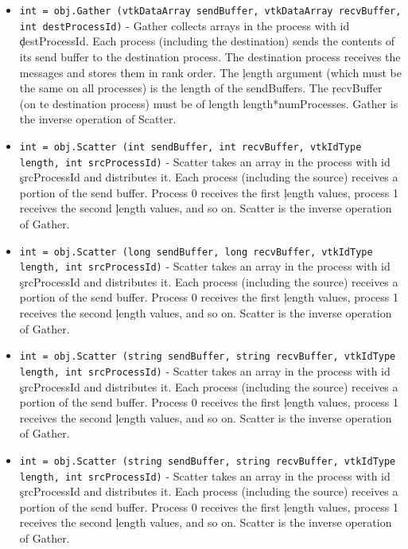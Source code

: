 \begin{itemize}
\item  \verb|int = obj.Gather (vtkDataArray sendBuffer, vtkDataArray recvBuffer, int destProcessId)| -  Gather collects arrays in the process with id \c destProcessId.  Each
 process (including the destination) sends the contents of its send buffer
 to the destination process.  The destination process receives the
 messages and stores them in rank order.  The \c length argument
 (which must be the same on all processes) is the length of the
 sendBuffers.  The \c recvBuffer (on te destination process) must be of
 length length*numProcesses.  Gather is the inverse operation of Scatter.

\item  \verb|int = obj.Scatter (int sendBuffer, int recvBuffer, vtkIdType length, int srcProcessId)| -  Scatter takes an array in the process with id \c srcProcessId and
 distributes it.  Each process (including the source) receives a portion of
 the send buffer.  Process 0 receives the first \c length values, process 1
 receives the second \c length values, and so on.  Scatter is the inverse
 operation of Gather.

\item  \verb|int = obj.Scatter (long sendBuffer, long recvBuffer, vtkIdType length, int srcProcessId)| -  Scatter takes an array in the process with id \c srcProcessId and
 distributes it.  Each process (including the source) receives a portion of
 the send buffer.  Process 0 receives the first \c length values, process 1
 receives the second \c length values, and so on.  Scatter is the inverse
 operation of Gather.

\item  \verb|int = obj.Scatter (string sendBuffer, string recvBuffer, vtkIdType length, int srcProcessId)| -  Scatter takes an array in the process with id \c srcProcessId and
 distributes it.  Each process (including the source) receives a portion of
 the send buffer.  Process 0 receives the first \c length values, process 1
 receives the second \c length values, and so on.  Scatter is the inverse
 operation of Gather.

\item  \verb|int = obj.Scatter (string sendBuffer, string recvBuffer, vtkIdType length, int srcProcessId)| -  Scatter takes an array in the process with id \c srcProcessId and
 distributes it.  Each process (including the source) receives a portion of
 the send buffer.  Process 0 receives the first \c length values, process 1
 receives the second \c length values, and so on.  Scatter is the inverse
 operation of Gather.


\end{itemize}

